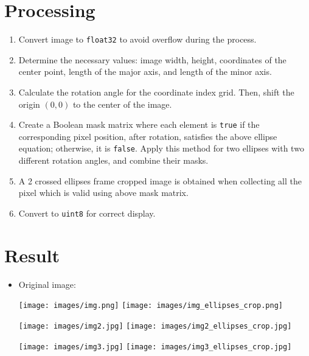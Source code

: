 \section{Processing}
\begin{enumerate}
    \item Convert image to \texttt{float32} to avoid overflow during the process.
    \item Determine the necessary values: image width, height, coordinates of the center point, length of the major axis, and length of the minor axis.
    \item Calculate the rotation angle for the coordinate index grid. Then, shift the origin \((0, 0)\) to the center of the image.
    \item Create a Boolean mask matrix where each element is \texttt{true} if the corresponding pixel position, after rotation, satisfies the above ellipse equation; otherwise, it is \texttt{false}. Apply this method for two ellipses with two different rotation angles, and combine their masks.
    \item A 2 crossed ellipses frame cropped image is obtained when collecting all the pixel which is valid using above mask matrix.
    \item Convert to \texttt{uint8} for correct display.
\end{enumerate}

\section{Result}
\begin{itemize}
    \item Original image:
    \begin{center}
        \texttt{[image: images/img.png]}
        \texttt{[image: images/img\_ellipses\_crop.png]}
    \end{center} 
    \begin{center}
        \texttt{[image: images/img2.jpg]}
        \texttt{[image: images/img2\_ellipses\_crop.jpg]}
    \end{center} 
    \begin{center}
        \texttt{[image: images/img3.jpg]}
        \texttt{[image: images/img3\_ellipses\_crop.jpg]}
    \end{center} 
\end{itemize}